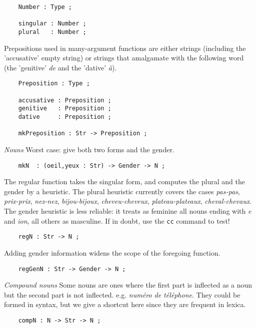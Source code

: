 \documentclass[11pt,a4paper]{article}
\newcommand{\subsubsubsection}[1]{\textit{#1}}
\begin{document}
\begin{verbatim}
    Number : Type ; 
  
    singular : Number ;
    plural   : Number ;
\end{verbatim}

Prepositions used in many-argument functions are either strings
(including the 'accusative' empty string) or strings that
amalgamate with the following word (the 'genitive' \textit{de} and the
'dative' \textit{à}).

\begin{verbatim}
    Preposition : Type ;
  
    accusative : Preposition ;
    genitive   : Preposition ;
    dative     : Preposition ;
  
    mkPreposition : Str -> Preposition ;
\end{verbatim}

\subsubsubsection{Nouns}
Worst case: give both two forms and the gender. 

\begin{verbatim}
    mkN  : (oeil,yeux : Str) -> Gender -> N ;
\end{verbatim}

The regular function takes the singular form,
and computes the plural and the gender by a heuristic. The plural 
heuristic currently
covers the cases \textit{pas-pas}, \textit{prix-prix}, \textit{nez-nez}, 
\textit{bijou-bijoux}, \textit{cheveu-cheveux}, \textit{plateau-plateaux}, \textit{cheval-chevaux}.
The gender heuristic is less reliable: it treats as feminine all
nouns ending with \textit{e} and \textit{ion}, all others as masculine.
If in doubt, use the \texttt{cc} command to test!

\begin{verbatim}
    regN : Str -> N ;
\end{verbatim}

Adding gender information widens the scope of the foregoing function.

\begin{verbatim}
    regGenN : Str -> Gender -> N ;
\end{verbatim}

\subsubsubsection{Compound nouns}
Some nouns are ones where the first part is inflected as a noun but
the second part is not inflected. e.g. \textit{numéro de téléphone}. 
They could be formed in syntax, but we give a shortcut here since
they are frequent in lexica.

\begin{verbatim}
    compN : N -> Str -> N ;
\end{verbatim}
\end{document}
